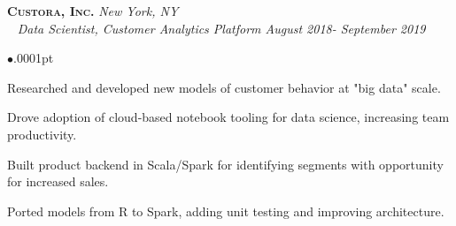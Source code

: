 \documentclass[11pt]{article}
\newcommand{\employer}[4]{
	{\hspace*{-20pt} {\small{\textbf{\textsc{ #1}}}}
  \hfill \small{\emph{#2}}\\ ~\hspace*{-20pt} \small \emph{ #3 \hfill #4}}\\ }
\newenvironment{achievements}{\begin{list}{$\bullet$}{\topsep .0001pt \itemsep -2pt}}{\vspace*{5pt}\end{list} }
\begin{document}
\employer{Custora, Inc.}{New York, NY}{Data Scientist, Customer Analytics Platform}{August 2018- September 2019}
	\begin{achievements}
	\item Researched and developed new models of customer behavior at "big data" scale.
	\item Drove adoption of cloud-based notebook tooling for data science, increasing team productivity.
	\item Built product backend in Scala/Spark for identifying segments with opportunity for increased sales.
	\item Ported models from R to Spark, adding unit testing and improving architecture.
	\end{achievements}
\end{document}
